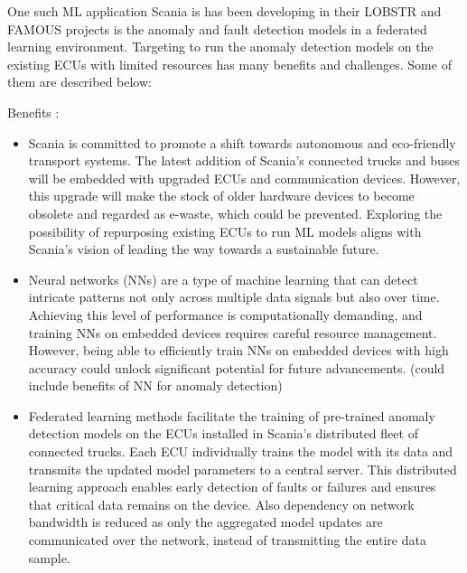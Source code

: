 One such ML application Scania is has been developing in their \textsc{LOBSTR} \cite{lobstr} and \textsc{FAMOUS} \cite{famous} projects is the anomaly and fault detection models in a federated learning environment. Targeting to run the anomaly detection models on the existing ECUs with limited resources has many benefits and challenges. Some of them are described below:

Benefits :
\begin{itemize}
	\item Scania is committed to promote a shift towards autonomous and eco-friendly transport systems. The latest addition of Scania's connected trucks and buses will be embedded with upgraded ECUs and communication devices. However, this upgrade will make the stock of older hardware devices to become obsolete and regarded as e-waste, which could be prevented. Exploring the possibility of repurposing existing ECUs to run ML models aligns with Scania's vision of leading the way towards a sustainable future.
	\item Neural networks (NNs) are a type of machine learning that can detect intricate patterns not only across multiple data signals but also over time. Achieving this level of performance is computationally demanding, and training NNs on embedded devices requires careful resource management. However, being able to efficiently train NNs on embedded devices with high accuracy could unlock significant potential for future advancements. (could include benefits of NN for anomaly detection)
	\item Federated learning methods facilitate the training of pre-trained anomaly detection models on the ECUs installed in Scania's distributed fleet of connected trucks. Each ECU individually trains the model with its data and transmits the updated model parameters to a central server. This distributed learning approach enables early detection of faults or failures and ensures that critical data remains on the device. Also dependency on network bandwidth is reduced as only the aggregated model updates are communicated over the network, instead of transmitting the entire data sample.
\end{itemize}

